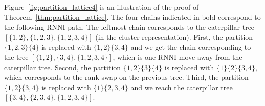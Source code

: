 \documentclass[11pt]{amsart}
\newcommand{\rnni}{\mathrm{RNNI}}
\providecommand{\DIFaddtex}[1]{{\protect\color{blue}\uwave{#1}}} %
\providecommand{\DIFdeltex}[1]{{\protect\color{red}\sout{#1}}}                      %
\providecommand{\DIFaddbegin}{} %
\providecommand{\DIFaddend}{} %
\providecommand{\DIFdelbegin}{} %
\providecommand{\DIFdelend}{} %
\providecommand{\DIFadd}[1]{\texorpdfstring{\DIFaddtex{#1}}{#1}} %
\providecommand{\DIFdel}[1]{\texorpdfstring{\DIFdeltex{#1}}{}} %
\newcommand{\DIFscaledelfig}{0.5}
\newlength{\DIFdelgraphicswidth} %
\newlength{\DIFdelgraphicsheight} %
\newcommand{\DIFaddincludegraphics}[2][]{{\color{blue}\fbox{\DIFOincludegraphics[#1]{#2}}}} %
\newcommand{\DIFdelincludegraphics}[2][]{%
\sbox{\DIFdelgraphicsbox}{\DIFOincludegraphics[#1]{#2}}%
\settoboxwidth{\DIFdelgraphicswidth}{\DIFdelgraphicsbox} %
\settoboxtotalheight{\DIFdelgraphicsheight}{\DIFdelgraphicsbox} %
\scalebox{\DIFscaledelfig}{%
\parbox[b]{\DIFdelgraphicswidth}{\usebox{\DIFdelgraphicsbox}\\[-\baselineskip] \rule{\DIFdelgraphicswidth}{0em}}\llap{\resizebox{\DIFdelgraphicswidth}{\DIFdelgraphicsheight}{%
\setlength{\unitlength}{\DIFdelgraphicswidth}%
\begin{picture}(1,1)%
\thicklines\linethickness{2pt} %
{\color[rgb]{1,0,0}\put(0,0){\framebox(1,1){}}}%
{\color[rgb]{1,0,0}\put(0,0){\line( 1,1){1}}}%
{\color[rgb]{1,0,0}\put(0,1){\line(1,-1){1}}}%
\end{picture}%
}\hspace*{3pt}}} %
} %
\DeclareRobustCommand{\DIFaddbegin}{\DIFOaddbegin \let\includegraphics\DIFaddincludegraphics} %
\DeclareRobustCommand{\DIFaddend}{\DIFOaddend \let\includegraphics\DIFOincludegraphics} %
\DeclareRobustCommand{\DIFdelbegin}{\DIFOdelbegin \let\includegraphics\DIFdelincludegraphics} %
\DeclareRobustCommand{\DIFdelend}{\DIFOaddend \let\includegraphics\DIFOincludegraphics} %
\begin{document}
Figure~\ref{fig:partition_lattice4} is an illustration of the proof of Theorem~\ref{thm:partition_lattice}.
The four \DIFdelbegin \DIFdel{chains indicated in bold }\DIFdelend \DIFaddbegin \DIFadd{dashed chains }\DIFaddend correspond to the following $\rnni$ path.
The leftmost chain corresponds to the caterpillar tree $[\{1, 2\}, \{1, 2, 3\}, \{1, 2, 3, 4\}]$ (in the cluster representation).
First, the partition $\{1, 2, 3\} \{4\}$ is replaced with $\{1, 2\} \{3, 4\}$ and we get the chain corresponding to the tree $[\{1, 2\}, \{3, 4\}, \{1, 2, 3, 4\}]$, which is one $\rnni$ move away from the caterpillar tree.
Second, the partition $\{1, 2\} \{3\} \{4\}$ is replaced with $\{1\} \{2\} \{3, 4\}$, which corresponds to the rank swap on the previous tree.
Third, the partition $\{1, 2\} \{3, 4\}$ is replaced with $\{1\} \{2, 3, 4\}$ and we reach the caterpillar tree $[\{3,4\}, \{2, 3, 4\}, \{1, 2, 3, 4\}]$.
\end{document}

